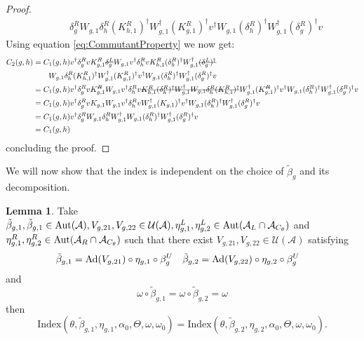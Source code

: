 \documentclass[12pt,a4paper,twoside]{article}
\newcommand{\stkout}[1]{\ifmmode\text{\sout{\ensuremath{#1}}}\else\sout{#1}\fi}
\let\originalleft\left
\let\originalright\right
\renewcommand{\left}{\mathopen{}\mathclose\bgroup\originalleft}
\renewcommand{\right}{\aftergroup\egroup\originalright}
\newcommand{\UU}{\mathcal U}
\renewcommand{\AA}{\mathcal A}
\newcommand{\Ad}[1]{\textrm{Ad}\left(#1\right)}
\newcommand{\Aut}[1]{\textrm{Aut}\left(#1\right)}
\theoremstyle{definition}
\newtheorem{lemma}[theorem]{Lemma}
\numberwithin{equation}{section}
\begin{document}
\begin{proof}
\begin{align}
		\nonumber
		&\qquad \delta_g^R W_{g,1}\delta_h^R (K_{h,1}^R)^\dagger W_{g,1}^\dagger (K_{g,1}^R)^\dagger v^\dagger W_{g,1}(\delta^R_h)^\dagger W_{g,1}^\dagger(\delta_g^R)^\dagger v
	\end{align}
	Using equation \eqref{eq:CommutantProperty} we now get:
	\begin{align}
		C_2(g,h)&=C_1(g,h)v^\dagger \delta_g^R v K_{g,1}^R \stkout{\delta_g^L} W_{g,1}v^\dagger \delta_h^R v K_{h,1}^R (\delta_h^R)^\dagger W_{g,1}^\dagger \stkout{(\delta_g^L)^\dagger}\\
		\nonumber
		&\qquad  W_{g,1}\delta_h^R (K_{h,1}^R)^\dagger W_{g,1}^\dagger (K_{g,1}^R)^\dagger v^\dagger W_{g,1}(\delta^R_h)^\dagger W_{g,1}^\dagger(\delta_g^R)^\dagger v\\
		&=C_1(g,h)v^\dagger \delta_g^R v K_{g,1}^\stkout{R} W_{g,1}v^\dagger \delta_h^R v \stkout{K_{h,1}^R (\delta_h^R)^\dagger W_{g,1}^\dagger W_{g,1}\delta_h^R (K_{h,1}^R)^\dagger} W_{g,1}^\dagger (K_{g,1}^\stkout{R})^\dagger v^\dagger W_{g,1}(\delta^R_h)^\dagger W_{g,1}^\dagger(\delta_g^R)^\dagger v\\
		&=C_1(g,h)v^\dagger \delta_g^R v K_{g,1} W_{g,1}v^\dagger \delta_h^R v W_{g,1}^\dagger (K_{g,1})^\dagger v^\dagger W_{g,1}(\delta^R_h)^\dagger W_{g,1}^\dagger(\delta_g^R)^\dagger v\\
		&=C_1(g,h)v^\dagger \delta_g^R W_{g,1} \delta_h^R W_{g,1}^\dagger  W_{g,1}(\delta^R_h)^\dagger W_{g,1}^\dagger(\delta_g^R)^\dagger v\\
		&=C_1(g,h)
	\end{align}
	concluding the proof.
\end{proof}
We will now show that the index is independent on the choice of $\tilde{\beta}_g$ and its decomposition.
\begin{lemma}\label{lem:InvarianceUnderChoiceBeta}
	Take $\tilde{\beta}_{g,1},\tilde{\beta}_{g,1}\in\Aut{\AA},V_{g,21},V_{g,22}\in\UU(\AA),\eta_{g,1}^L,\eta_{g,2}^L\in \Aut{\AA_L\cap\AA_{C_\theta}}$ and $\eta_{g,1}^R,\eta_{g,2}^R\in \Aut{\AA_R\cap\AA_{C_\theta}}$ such that there exist $V_{g,21},V_{g,22}\in\UU(\AA)$ satisfying
	\begin{align}
		\tilde{\beta}_{g,1}&=\Ad{V_{g,21}}\circ\eta_{g,1}\circ\beta^U_g&\tilde{\beta}_{g,2}&=\Ad{V_{g,22}}\circ\eta_{g,2}\circ\beta^U_g
	\end{align}
	and
	\begin{equation}
		\omega\circ\tilde{\beta}_{g,1}=\omega\circ\tilde{\beta}_{g,2}=\omega
	\end{equation}
	then
	\begin{equation}
		\textrm{Index}(\theta,\tilde{\beta}_{g,1},\eta_{g,1},\alpha_{0},\Theta,\omega,\omega_0)=\textrm{Index}(\theta,\tilde{\beta}_{g,2},\eta_{g,2},\alpha_{0},\Theta,\omega,\omega_0).
	\end{equation}
\end{lemma}
\end{document}
